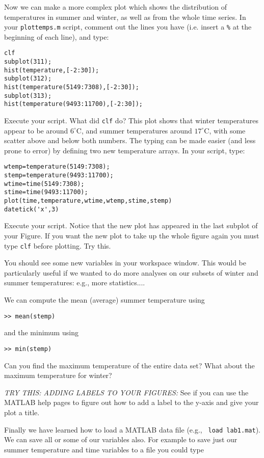 \documentclass[letterpaper]{article}
\begin{document}
Now we can make a more complex plot which shows the distribution of temperatures in
summer and winter, as well as from the whole time series.  In your 
\verb+plottemps.m+ script, comment out the lines you have (i.e. insert a \verb+%+
at the beginning of each line), and type:
\begin{verbatim}
clf
subplot(311);
hist(temperature,[-2:30]);
subplot(312);  
hist(temperature(5149:7308),[-2:30]);
subplot(313);  
hist(temperature(9493:11700),[-2:30]);
\end{verbatim}
 
Execute your script.  What did \verb+clf+ do?
This plot shows that winter temperatures appear to be around $6^\circ$C, and
summer temperatures around $17^\circ$C, with some scatter above and below
both numbers.   The typing can be made easier (and less prone to error) by 
defining two new temperature arrays.  In your script, type:

\begin{verbatim}
wtemp=temperature(5149:7308);
stemp=temperature(9493:11700);
wtime=time(5149:7308);
stime=time(9493:11700);
plot(time,temperature,wtime,wtemp,stime,stemp)
datetick('x',3)
\end{verbatim}

Execute your script.  Notice that the new plot has appeared in the last subplot
of your Figure.  If you want the new plot to take up the whole figure again you must
type \verb+clf+ before plotting.  Try this.

You should see some new variables in your workspace window.
This would be particularly useful if we wanted to do more analyses on our subsets of winter
and summer temperatures: e.g., more statistics....

We can compute the mean (average) summer temperature using
\begin{verbatim}
>> mean(stemp)
\end{verbatim}
and the minimum using
\begin{verbatim}
>> min(stemp)
\end{verbatim}
Can you find the maximum temperature of the entire data set?  What about the maximum temperature for winter?

{\it TRY THIS: ADDING LABELS TO YOUR FIGURES:}  See if you can use the MATLAB help pages to figure out how to add a label to the
y-axis and give your plot a title.

Finally we have learned how to load a MATLAB data file (e.g., \verb+ load lab1.mat+).  We can save all or some of our variables
also. For example to save just our  summer temperature and time variables to a file you could type
\end{document}
